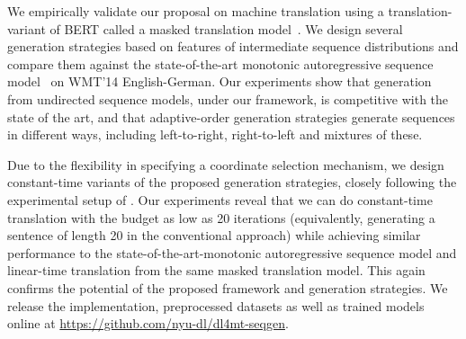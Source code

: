 \documentclass{article}
\newcommand{\red}[1]{\textcolor{red}{#1}}
\begin{document}
We empirically validate our proposal on machine translation using a translation-variant of BERT called a masked translation model~\citep{lample2019cross}. We design several generation strategies based on features of intermediate sequence distributions
and compare them against the state-of-the-art monotonic autoregressive sequence model~\citep{vaswani2017attention} on WMT'14 English-German. Our experiments show that generation from undirected sequence models, under our framework, is competitive with the state of the art, and that adaptive-order generation strategies generate sequences in different ways, including left-to-right, right-to-left and mixtures of these. %

Due to the flexibility in specifying a coordinate selection mechanism, we design constant-time variants of the proposed generation strategies, closely following the experimental setup of \citet{ghazvininejad2019constant}. Our experiments reveal that we can do constant-time translation with the budget as low as 20 iterations (equivalently, generating a sentence of length 20 in the conventional approach) while achieving similar performance to the state-of-the-art-monotonic autoregressive sequence model and linear-time translation from the same masked translation model. This again confirms the potential of the proposed framework and generation strategies. We release the implementation, preprocessed datasets as well as trained models online at \url{https://github.com/nyu-dl/dl4mt-seqgen}.

%
\end{document}
